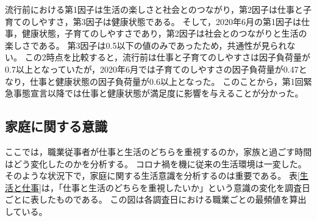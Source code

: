 \documentclass[paper={210mm,297mm},line_length=35zw,number_of_lines=31,head_space=30mm,gutter=40mm,baselineskip=2.0zw,headfoot_verticalposition=1.5zw]{jlreq} %
\begin{document}
流行前における第1因子は生活の楽しさと社会とのつながり，第2因子は仕事と子育てのしやすさ，第3因子は健康状態である。
そして，2020年6月の第1因子は仕事，健康状態，子育てのしやすさであり，第2因子は社会とのつながりと生活の楽しさである。
第3因子は0.5以下の値のみであったため，共通性が見られない。
この2時点を比較すると，流行前は仕事と子育てのしやすさは因子負荷量が0.7以上となっていたが，2020年6月では子育てのしやすさの因子負荷量が0.47となり，仕事と健康状態の因子負荷量が0.6以上となった。
このことから，第1回緊急事態宣言以降では仕事と健康状態が満足度に影響を与えることが分かった。\\

\subsection{家庭に関する意識}

ここでは，職業従事者が仕事と生活のどちらを重視するのか，家族と過ごす時間はどう変化したのかを分析する。
コロナ禍を機に従来の生活環境は一変した。
そのような状況下で，家庭に関する生活意識を分析するのは重要である。
表\ref{生活と仕事}は，「仕事と生活のどちらを重視したいか」という意識の変化を調査日ごとに表したものである。
この図は各調査日における職業ごとの最頻値を算出している。\\
\end{document}
